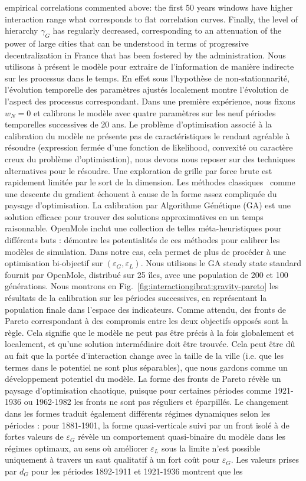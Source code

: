 {empirical correlations commented above: the first 50 years windows have higher interaction range what corresponds to flat correlation curves. Finally, the level of hierarchy $\gamma_G$ has regularly decreased, corresponding to an attenuation of the power of large cities that can be understood in terms of progressive decentralization in France that has been fostered by the administration.
}{
Nous utilisons à présent le modèle pour extraire de l'information de manière indirecte sur les processus dans le temps. En effet sous l'hypothèse de non-stationnarité, l'évolution temporelle des paramètres ajustés localement montre l'évolution de l'aspect des processus correspondant. Dans une première expérience, nous fixons $w_N=0$ et calibrons le modèle avec quatre paramètres sur les neuf périodes temporelles successives de 20 ans. Le problème d'optimisation associé à la calibration du modèle ne présente pas de caractéristiques le rendant agréable à résoudre (expression fermée d'une fonction de likelihood, convexité ou caractère creux du problème d'optimisation), nous devons nous reposer sur des techniques alternatives pour le résoudre. Une exploration de grille par force brute est rapidement limitée par le sort de la dimension. Les méthodes classiques~\citep{batty1972calibration} comme une descente du gradient échouent à cause de la forme assez compliquée du paysage d'optimisation. La calibration par Algorithme Génétique (GA) est une solution efficace pour trouver des solutions approximatives en un temps raisonnable. OpenMole inclut une collection de telles méta-heuristiques pour différents buts : \cite{schmitt2014half} démontre les potentialités de ces méthodes pour calibrer les modèles de simulation. Dans notre cas, cela permet de plus de procéder à une optimisation bi-objectif sur $(\varepsilon_G,\varepsilon_L)$. Nous utilisons le GA steady state standard fournit par OpenMole, distribué sur 25 îles, avec une population de 200 et 100 générations. Nous montrons en Fig.~\ref{fig:interactiongibrat:gravity-pareto} les résultats de la calibration sur les périodes successives, en représentant la population finale dans l'espace des indicateurs. Comme attendu, des fronts de Pareto correspondant à des compromis entre les deux objectifs opposés sont la règle. Cela signifie que le modèle ne peut pas être précis à la fois globalement et localement, et qu'une solution intermédiaire doit être trouvée. Cela peut être dû au fait que la portée d'interaction change avec la taille de la ville (i.e. que les termes dans le potentiel ne sont plus séparables), que nous gardons comme un développement potentiel du modèle. La forme des fronts de Pareto révèle un paysage d'optimisation chaotique, puisque pour certaines périodes comme 1921-1936 ou 1962-1982 les fronts ne sont pas réguliers et éparpillés. Le changement dans les formes traduit également différents régimes dynamiques selon les périodes : pour 1881-1901, la forme quasi-verticale suivi par un front isolé à de fortes valeurs de $\varepsilon_G$ révèle un comportement quasi-binaire du modèle dans les régimes optimaux, au sens où améliorer $\varepsilon_L$ sous la limite n'est possible uniquement à travers un saut qualitatif à un fort coût pour $\varepsilon_G$. Les valeurs prises par $d_G$ pour les périodes 1892-1911 et 1921-1936 montrent que les }
